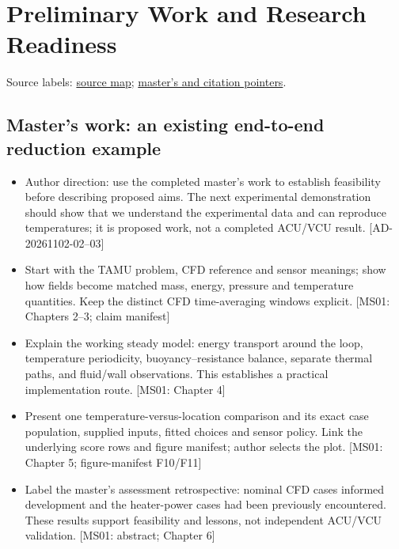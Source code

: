 \section{Preliminary Work and Research Readiness}
\noindent\small Source labels: \href{run:doc_support/reconciliation/2026-11-02/SOURCES.md}{source map}; \href{run:doc_support/reconciliation/2026-11-02/MASTER_AND_CITATION_POINTERS.md}{master's and citation pointers}.\normalsize

\subsection{Master's work: an existing end-to-end reduction example}
\begin{itemize}[leftmargin=*]
\item Author direction: use the completed master's work to establish feasibility before describing proposed aims. The next experimental demonstration should show that we understand the experimental data and can reproduce temperatures; it is proposed work, not a completed ACU/VCU result. [AD-20261102-02--03]\cite{fierro2026cfdoneD}
\item Start with the TAMU problem, CFD reference and sensor meanings; show how fields become matched mass, energy, pressure and temperature quantities. Keep the distinct CFD time-averaging windows explicit. [MS01: Chapters 2--3; claim manifest]
\item Explain the working steady model: energy transport around the loop, temperature periodicity, buoyancy--resistance balance, separate thermal paths, and fluid/wall observations. This establishes a practical implementation route. [MS01: Chapter 4]
\item Present one temperature-versus-location comparison and its exact case population, supplied inputs, fitted choices and sensor policy. Link the underlying score rows and figure manifest; author selects the plot. [MS01: Chapter 5; figure-manifest F10/F11]
\item Label the master's assessment retrospective: nominal CFD cases informed development and the heater-power cases had been previously encountered. These results support feasibility and lessons, not independent ACU/VCU validation. [MS01: abstract; Chapter 6]
\end{itemize}

